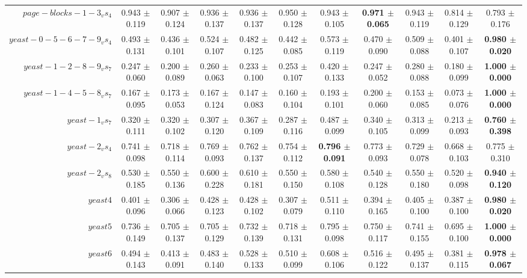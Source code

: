 \begin{table}[!ht]
{\begin{tabular}{r c c c c c c c c c c}
$page-blocks-1-3_vs_4$ & 0.943 $\pm$ 0.119 & 0.907 $\pm$ 0.124 & 0.936 $\pm$ 0.137 & 0.936 $\pm$ 0.137 & 0.950 $\pm$ 0.128 & 0.943 $\pm$ 0.105 & \textbf{0.971 $\pm$ 0.065} & 0.943 $\pm$ 0.119 & 0.814 $\pm$ 0.129 & 0.793 $\pm$ 0.176 \\
$yeast-0-5-6-7-9_vs_4$ & 0.493 $\pm$ 0.131 & 0.436 $\pm$ 0.101 & 0.524 $\pm$ 0.107 & 0.482 $\pm$ 0.125 & 0.442 $\pm$ 0.085 & 0.573 $\pm$ 0.119 & 0.470 $\pm$ 0.090 & 0.509 $\pm$ 0.088 & 0.401 $\pm$ 0.107 & \textbf{0.980 $\pm$ 0.020} \\
$yeast-1-2-8-9_vs_7$ & 0.247 $\pm$ 0.060 & 0.200 $\pm$ 0.089 & 0.260 $\pm$ 0.063 & 0.233 $\pm$ 0.100 & 0.253 $\pm$ 0.107 & 0.420 $\pm$ 0.133 & 0.247 $\pm$ 0.052 & 0.280 $\pm$ 0.088 & 0.180 $\pm$ 0.099 & \textbf{1.000 $\pm$ 0.000} \\
$yeast-1-4-5-8_vs_7$ & 0.167 $\pm$ 0.095 & 0.173 $\pm$ 0.053 & 0.167 $\pm$ 0.124 & 0.147 $\pm$ 0.083 & 0.160 $\pm$ 0.104 & 0.193 $\pm$ 0.101 & 0.200 $\pm$ 0.060 & 0.153 $\pm$ 0.085 & 0.073 $\pm$ 0.076 & \textbf{1.000 $\pm$ 0.000} \\
$yeast-1_vs_7$ & 0.320 $\pm$ 0.111 & 0.320 $\pm$ 0.102 & 0.307 $\pm$ 0.120 & 0.367 $\pm$ 0.109 & 0.287 $\pm$ 0.116 & 0.487 $\pm$ 0.099 & 0.340 $\pm$ 0.105 & 0.313 $\pm$ 0.099 & 0.213 $\pm$ 0.093 & \textbf{0.760 $\pm$ 0.398} \\
$yeast-2_vs_4$ & 0.741 $\pm$ 0.098 & 0.718 $\pm$ 0.114 & 0.769 $\pm$ 0.093 & 0.762 $\pm$ 0.137 & 0.754 $\pm$ 0.112 & \textbf{0.796 $\pm$ 0.091} & 0.773 $\pm$ 0.093 & 0.729 $\pm$ 0.078 & 0.668 $\pm$ 0.103 & 0.775 $\pm$ 0.310 \\
$yeast-2_vs_8$ & 0.530 $\pm$ 0.185 & 0.550 $\pm$ 0.136 & 0.600 $\pm$ 0.228 & 0.610 $\pm$ 0.181 & 0.550 $\pm$ 0.150 & 0.580 $\pm$ 0.108 & 0.540 $\pm$ 0.128 & 0.550 $\pm$ 0.180 & 0.520 $\pm$ 0.098 & \textbf{0.940 $\pm$ 0.120} \\
$yeast4$ & 0.401 $\pm$ 0.096 & 0.306 $\pm$ 0.066 & 0.428 $\pm$ 0.123 & 0.428 $\pm$ 0.102 & 0.307 $\pm$ 0.079 & 0.511 $\pm$ 0.110 & 0.394 $\pm$ 0.165 & 0.405 $\pm$ 0.100 & 0.387 $\pm$ 0.100 & \textbf{0.980 $\pm$ 0.020} \\
$yeast5$ & 0.736 $\pm$ 0.149 & 0.705 $\pm$ 0.137 & 0.705 $\pm$ 0.129 & 0.732 $\pm$ 0.139 & 0.718 $\pm$ 0.131 & 0.795 $\pm$ 0.098 & 0.750 $\pm$ 0.117 & 0.741 $\pm$ 0.155 & 0.695 $\pm$ 0.100 & \textbf{1.000 $\pm$ 0.000} \\
$yeast6$ & 0.494 $\pm$ 0.143 & 0.413 $\pm$ 0.091 & 0.483 $\pm$ 0.140 & 0.528 $\pm$ 0.133 & 0.510 $\pm$ 0.099 & 0.608 $\pm$ 0.106 & 0.516 $\pm$ 0.122 & 0.495 $\pm$ 0.137 & 0.381 $\pm$ 0.115 & \textbf{0.978 $\pm$ 0.067} \\

\end{tabular}}
\end{table}
